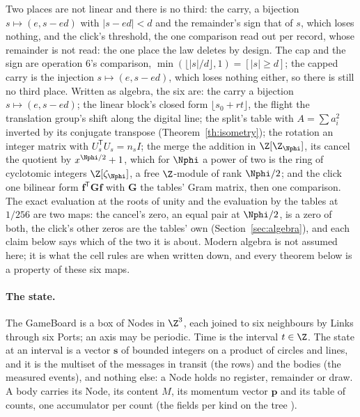 Two places are not linear and there is no third: the carry, a bijection
$s \mapsto (e, s - ed)$ with $|s - ed| < d$ and the remainder's sign that of $s$, which loses nothing, and the click's threshold,
the one comparison read out per record, whose remainder is not read:
the one place the law deletes by design. The cap and the sign are
operation 6's comparison, $\min(\lfloor |s|/d \rfloor, 1) = [|s| \ge
d]$; the capped carry is the injection $s \mapsto (e, s - ed)$, which
loses nothing either, so there is still no third place. Written as algebra, the six are: the carry a bijection $s \mapsto (e, s - ed)$; the linear block's closed form $\lfloor s_0 + rt \rfloor$, the flight the translation group's shift along the digital line; the split's table with $A = \sum a_i^2$ inverted by its conjugate transpose (Theorem~\ref{th:isometry}); the rotation an integer matrix with $U_s^{\mathsf T}U_s = n_s I$; the merge the addition in $\Z[\Z_{\Nphi}]$, its cancel the quotient by $x^{\Nphi/2} + 1$, which for $\Nphi$ a power of two is the ring of cyclotomic integers $\Z[\zeta_{\Nphi}]$, a free $\Z$-module of rank $\Nphi/2$; and the click one bilinear form $\mathbf f^{\mathsf T}\mathbf G\mathbf f$ with $\mathbf G$ the tables' Gram matrix, then one comparison. The exact evaluation at the roots of unity and the evaluation by the tables at $1/256$ are two maps: the cancel's zero, an equal pair at $\Nphi/2$, is a zero of both, the click's other zeros are the tables' own (Section~\ref{sec:algebra}), and each claim below says which of the two it is about. Modern algebra is not assumed here; it is what the cell rules are when written down, and every theorem below is a property of these six maps.

\paragraph{The state.} The GameBoard is a box of Nodes in $\Z^3$, each
joined to six neighbours by Links through six Ports; an axis may be
periodic. Time is the interval $t \in \Z$. The state at an interval is a
vector $\mathbf s$ of bounded integers on a product of circles and lines,
and it is the multiset of the messages in transit (the rows) and the
bodies (the measured events), and nothing else: a Node holds no
register, remainder or draw.  A body carries its Node, its content $M$, its momentum
vector $\mathbf p$ and its table of counts, one accumulator per count
(the fields per kind on the tree \cite{familiesaudit}).

